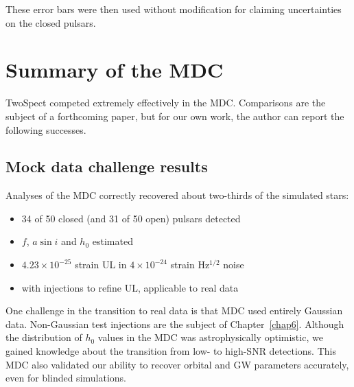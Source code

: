 These error bars were then used without modification for claiming uncertainties on the closed pulsars.



\section{Summary of the MDC}

TwoSpect competed extremely effectively in the MDC.
Comparisons are the subject of a forthcoming paper, but for our own work, the author can report the following successes.

\subsection{Mock data challenge results}

Analyses of the MDC correctly recovered about two-thirds of the simulated stars:

\begin{itemize}
\item 34 of 50 closed (and 31 of 50 open) pulsars detected
\item $f$, $a \sin i$ and $h_0$ estimated
\item $4.23\times 10^{-25}$ strain UL in $4 \times 10^{-24}$ strain Hz$^{1/2}$ noise
\item with injections to refine UL, applicable to real data
\end{itemize}

One challenge in the transition to real data is that MDC used entirely Gaussian data.
Non-Gaussian test injections are the subject of Chapter~\ref{chap6}.
Although the distribution of $h_0$ values in the MDC was astrophysically optimistic, we gained knowledge about the transition from low- to high-SNR detections.
This MDC also validated our ability to recover orbital and GW parameters accurately, even for blinded simulations.

